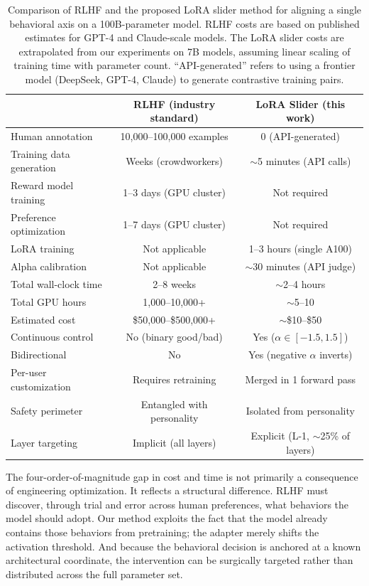 \documentclass[11pt,a4paper]{article}
\begin{document}
\begin{table}[H]
\centering
\begin{tabular}{lcc}
\toprule
& \textbf{RLHF (industry standard)} & \textbf{LoRA Slider (this work)} \\
\midrule
Human annotation & 10,000--100,000 examples & 0 (API-generated) \\
Training data generation & Weeks (crowdworkers) & $\sim$5 minutes (API calls) \\
Reward model training & 1--3 days (GPU cluster) & Not required \\
Preference optimization & 1--7 days (GPU cluster) & Not required \\
LoRA training & Not applicable & 1--3 hours (single A100) \\
Alpha calibration & Not applicable & $\sim$30 minutes (API judge) \\
\midrule
Total wall-clock time & 2--8 weeks & $\sim$2--4 hours \\
Total GPU hours & 1,000--10,000+ & $\sim$5--10 \\
Estimated cost & \$50,000--\$500,000+ & $\sim$\$10--\$50 \\
\midrule
Continuous control & No (binary good/bad) & Yes ($\alpha \in [-1.5, 1.5]$) \\
Bidirectional & No & Yes (negative $\alpha$ inverts) \\
Per-user customization & Requires retraining & Merged in 1 forward pass \\
Safety perimeter & Entangled with personality & Isolated from personality \\
Layer targeting & Implicit (all layers) & Explicit (L-1, $\sim$25\% of layers) \\
\bottomrule
\end{tabular}
\caption{Comparison of RLHF and the proposed LoRA slider method for aligning a single behavioral axis on a 100B-parameter model. RLHF costs are based on published estimates for GPT-4 and Claude-scale models. The LoRA slider costs are extrapolated from our experiments on 7B models, assuming linear scaling of training time with parameter count. ``API-generated'' refers to using a frontier model (DeepSeek, GPT-4, Claude) to generate contrastive training pairs.}
\label{tab:comparison}
\end{table}

The four-order-of-magnitude gap in cost and time is not primarily a consequence of engineering optimization. It reflects a structural difference. RLHF must discover, through trial and error across human preferences, what behaviors the model should adopt. Our method exploits the fact that the model already contains those behaviors from pretraining; the adapter merely shifts the activation threshold. And because the behavioral decision is anchored at a known architectural coordinate, the intervention can be surgically targeted rather than distributed across the full parameter set.
\end{document}
